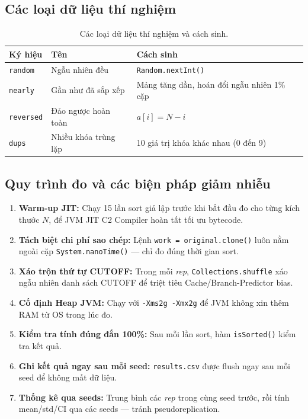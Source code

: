\documentclass[12pt, a4paper]{article}
\begin{document}
\subsection{Các loại dữ liệu thí nghiệm}

\begin{table}[H]
\centering
\caption{Các loại dữ liệu thí nghiệm và cách sinh.}
\label{tab:datatypes}
\renewcommand{\arraystretch}{1.3}
\begin{tabular}{lll}
\toprule
Ký hiệu & Tên & Cách sinh \\
\midrule
\rowcolor{rowodd}  \texttt{random}   & Ngẫu nhiên đều          & \texttt{Random.nextInt()} \\
\rowcolor{roweven} \texttt{nearly}   & Gần như đã sắp xếp      & Mảng tăng dần, hoán đổi ngẫu nhiên 1\% cặp \\
\rowcolor{rowodd}  \texttt{reversed} & Đảo ngược hoàn toàn     & $a[i] = N - i$ \\
\rowcolor{roweven} \texttt{dups}     & Nhiều khóa trùng lặp    & 10 giá trị khóa khác nhau (0 đến 9) \\
\bottomrule
\end{tabular}
\end{table}

\subsection{Quy trình đo và các biện pháp giảm nhiễu}

\begin{enumerate}
    \item \textbf{Warm-up JIT:} Chạy 15 lần sort giả lập trước khi bắt đầu đo cho
          từng kích thước $N$, để JVM JIT C2 Compiler hoàn tất tối ưu bytecode.
    \item \textbf{Tách biệt chi phí sao chép:} Lệnh \texttt{work = original.clone()}
          luôn nằm ngoài cặp \texttt{System.nanoTime()} — chỉ đo đúng thời gian sort.
    \item \textbf{Xáo trộn thứ tự CUTOFF:} Trong mỗi \textit{rep},
          \texttt{Collections.shuffle} xáo ngẫu nhiên danh sách CUTOFF để triệt tiêu
          Cache/Branch-Predictor bias.
    \item \textbf{Cố định Heap JVM:} Chạy với \texttt{-Xms2g -Xmx2g} để JVM không
          xin thêm RAM từ OS trong lúc đo.
    \item \textbf{Kiểm tra tính đúng đắn 100\%:} Sau mỗi lần sort, hàm
          \texttt{isSorted()} kiểm tra kết quả.
    \item \textbf{Ghi kết quả ngay sau mỗi seed:} \texttt{results.csv} được flush
          ngay sau mỗi seed để không mất dữ liệu.
    \item \textbf{Thống kê qua seeds:} Trung bình các \textit{rep} trong cùng seed
          trước, rồi tính mean/std/CI qua các seeds — tránh pseudoreplication.
\end{enumerate}
\end{document}
